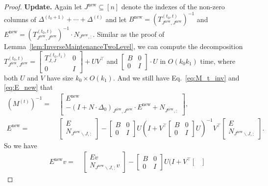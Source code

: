 \documentclass[11pt]{article}
\newcommand{\new}{\mathrm{new}}
\newcommand\vv{\boldsymbol{\mathit{v}}}
\newcommand\BB{\boldsymbol{\mathit{B}}}
\newcommand\EE{\boldsymbol{\mathit{E}}}
\newcommand\II{\boldsymbol{\mathit{I}}}
\newcommand\NN{\boldsymbol{\mathit{N}}}
\newcommand\MM{\boldsymbol{\mathit{M}}}
\newcommand\TT{\boldsymbol{\mathit{T}}}
\newcommand\UU{\boldsymbol{\mathit{U}}}
\newcommand\VV{\boldsymbol{\mathit{V}}}
\newcommand{\ov}{\overline}
\begin{document}
\begin{proof}
{\bf Update.} Again let $J^{\new} \subseteq [n]$ denote the indexes of the non-zero columns of $\Delta^{(t_0+1)} + \cdots + \Delta^{(t)}$ and let $\BB^{\new} = (\TT^{(t_0,t)}_{J^{\new},J^{\new}})^{-1}$ and $\EE^{\new} = (\TT^{(t_0,t)}_{J^{\new},J^{\new}})^{-1} \cdot \NN_{J^{\new},:}$. Similar as the proof of Lemma~\ref{lem:InverseMaintenanceTwoLevel}, we can compute the decomposition $\TT^{(t_0,t)}_{J^{\new},J^{\new}} = \begin{bmatrix}
\TT^{(t_0,t_1)}_{J,J} & 0 \\
0 & \II
\end{bmatrix} + \UU \VV^{\top}$ and $\begin{bmatrix}
\BB & 0 \\
0 & \II
\end{bmatrix} \cdot \UU$ in $O(k_0 k_1)$ time, where both $\UU$ and $\VV$ have size $k_0 \times O(k_1)$. And we still have Eq.~\eqref{eq:M_t_inv} and \eqref{eq:E_new} that
\begin{align*}
(\MM^{(t)})^{-1} = &~ \begin{bmatrix}
\EE^{\new} \\
- (\II + \NN \cdot \Delta_0)_{\overline{J^{\new}},J^{\new}} \cdot \EE^{\new} + \NN_{\ov{J^{\new}}, :} 
\end{bmatrix}, \\
\EE^{\new} = &~ \begin{bmatrix}
\EE \\
\NN_{J^{\new} \backslash J,:}
\end{bmatrix} 
- \begin{bmatrix}
\BB & 0 \\
0 & \II
\end{bmatrix} \UU (\II + \VV^{\top} \begin{bmatrix}
\BB & 0 \\
0 & \II
\end{bmatrix} \UU)^{-1} \VV^{\top} \begin{bmatrix}
\EE \\
\NN_{J^{\new}\backslash J,:}
\end{bmatrix}.
\end{align*}
So we have
\begin{align*}
\EE^{\new} \vv = &~ \begin{bmatrix}
\EE \vv \\
\NN_{J^{\new} \backslash J,:} \vv
\end{bmatrix} 
- \begin{bmatrix}
\BB & 0 \\
0 & \II
\end{bmatrix} \UU (\II + \VV^{\top} \begin{bmatrix}

\end{bmatrix}
\end{align*}
\end{proof}
\end{document}

